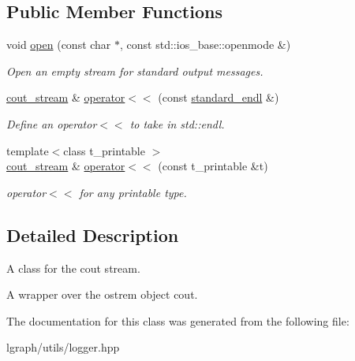 \subsection*{Public Member Functions}
\begin{DoxyCompactItemize}
\item 
\hypertarget{classlgraph_1_1utils_1_1cout__stream_a818a63700e577a13db63088353ce4098}{void \hyperlink{classlgraph_1_1utils_1_1cout__stream_a818a63700e577a13db63088353ce4098}{open} (const char $\ast$, const std\-::ios\-\_\-base\-::openmode \&)}\label{classlgraph_1_1utils_1_1cout__stream_a818a63700e577a13db63088353ce4098}

\begin{DoxyCompactList}\small\item\em Open an empty stream for standard output messages. \end{DoxyCompactList}\item 
\hypertarget{classlgraph_1_1utils_1_1cout__stream_a6e35f97a622bccec72247d6f9e6ca2c8}{\hyperlink{classlgraph_1_1utils_1_1cout__stream}{cout\-\_\-stream} \& \hyperlink{classlgraph_1_1utils_1_1cout__stream_a6e35f97a622bccec72247d6f9e6ca2c8}{operator$<$$<$} (const \hyperlink{classlgraph_1_1utils_1_1cout__stream_a8d78b6d03f5ae2ffbdc9f859dfe039b3}{standard\-\_\-endl} \&)}\label{classlgraph_1_1utils_1_1cout__stream_a6e35f97a622bccec72247d6f9e6ca2c8}

\begin{DoxyCompactList}\small\item\em Define an operator$<$$<$ to take in std\-::endl. \end{DoxyCompactList}\item 
\hypertarget{classlgraph_1_1utils_1_1cout__stream_a88f6cf6d54312f795ccbff57724d51e4}{{\footnotesize template$<$class t\-\_\-printable $>$ }\\\hyperlink{classlgraph_1_1utils_1_1cout__stream}{cout\-\_\-stream} \& \hyperlink{classlgraph_1_1utils_1_1cout__stream_a88f6cf6d54312f795ccbff57724d51e4}{operator$<$$<$} (const t\-\_\-printable \&t)}\label{classlgraph_1_1utils_1_1cout__stream_a88f6cf6d54312f795ccbff57724d51e4}

\begin{DoxyCompactList}\small\item\em operator$<$$<$ for any printable type. \end{DoxyCompactList}\end{DoxyCompactItemize}


\subsection{Detailed Description}
A class for the cout stream. 

A wrapper over the ostrem object cout. 

The documentation for this class was generated from the following file\-:\begin{DoxyCompactItemize}
\item 
lgraph/utils/logger.\-hpp\end{DoxyCompactItemize}
